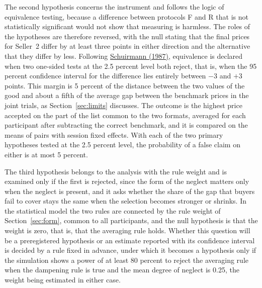 \documentclass[11pt,a4paper]{article}
\newcommand{\cy}[2]{\hyperlink{cite.#1}{\textcolor{citecolor}{#2}}}
\newcommand{\prot}[1]{\textsf{#1}}
\begin{document}
The second hypothesis concerns the instrument and follows the logic of equivalence testing, because a difference between protocols \prot{F} and \prot{R} that is not statistically significant would not show that measuring is harmless. The roles of the hypotheses are therefore reversed, with the null stating that the final prices for Seller~2 differ by at least three points in either direction and the alternative that they differ by less. Following \cy{schuirmann}{Schuirmann (1987)}, equivalence is declared when two one-sided tests at the 2.5 percent level both reject, that is, when the 95 percent confidence interval for the difference lies entirely between $-3$ and $+3$ points. This margin is 5 percent of the distance between the two values of the good and about a fifth of the average gap between the benchmark prices in the joint trials, as Section~\ref{sec:limits} discusses. The outcome is the highest price accepted on the part of the list common to the two formats, averaged for each participant after subtracting the correct benchmark, and it is compared on the means of pairs with session fixed effects. With each of the two primary hypotheses tested at the 2.5 percent level, the probability of a false claim on either is at most 5 percent.

The third hypothesis belongs to the analysis with the rule weight and is examined only if the first is rejected, since the form of the neglect matters only when the neglect is present, and it asks whether the share of the gap that buyers fail to cover stays the same when the selection becomes stronger or shrinks. In the statistical model the two rules are connected by the rule weight of Section~\ref{sec:form}, common to all participants, and the null hypothesis is that the weight is zero, that is, that the averaging rule holds. Whether this question will be a preregistered hypothesis or an estimate reported with its confidence interval is decided by a rule fixed in advance, under which it becomes a hypothesis only if the simulation shows a power of at least 80 percent to reject the averaging rule when the dampening rule is true and the mean degree of neglect is 0.25, the weight being estimated in either case.
\end{document}

